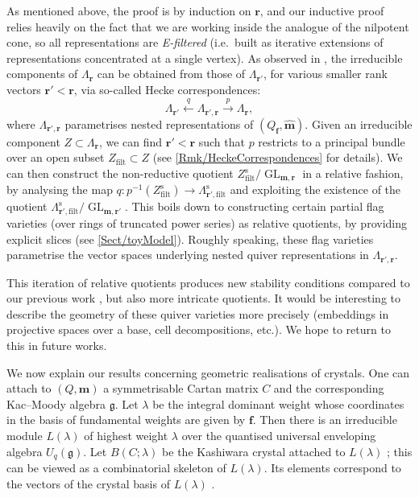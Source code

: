 \documentclass[a4paper,12pt]{article}
\theoremstyle{definition}
\theoremstyle{plain}
\theoremstyle{remark}
\DeclareMathOperator{\GL}{GL}
\newcommand{\st}{\mathrm{s}}
\newcommand\bff{\mathbf{f}}
\newcommand\bfm{\mathbf{m}}
\newcommand\bfr{\mathbf{r}}
\begin{document}
As mentioned above, the proof is by induction on $\bfr$, and our inductive proof relies heavily on the fact that we are working inside the analogue of the nilpotent cone, so all representations are \emph{E-filtered} (i.e.\ built as iterative extensions of representations concentrated at a single vertex). As observed in \cite{Lus91,GLS18a}, the irreducible components of $\Lambda_\bfr$ can be obtained from those of $\Lambda_{\bfr'}$, for various smaller rank vectors $\bfr'<\bfr$, via so-called Hecke correspondences:
\[
\Lambda_{\bfr'}\overset{q}{\longleftarrow}\Lambda_{\bfr',\bfr}\overset{p}{\longrightarrow}\Lambda_\bfr
,
\]
where $\Lambda_{\bfr',\bfr}$ parametrises nested representations of $(Q_\bff,\widehat{\bfm})$. Given an irreducible component $Z\subset\Lambda_\bfr$, we can find $\bfr'<\bfr$ such that $p$ restricts to a principal bundle over an open subset $Z_{\mathrm{filt}}\subset Z$ (see \cref{Rmk/HeckeCorrespondences} for details). We can then construct the non-reductive quotient $Z_{\mathrm{filt}}^\st/\GL_{\bfm,\bfr}$ in a relative fashion, by analysing the map $q:p^{-1}(Z_{\mathrm{filt}}^\st)\rightarrow\Lambda_{\bfr',\mathrm{filt}}^\st$ and exploiting the existence of the quotient $\Lambda_{\bfr',\mathrm{filt}}^\st/\GL_{\bfm,\bfr'}$. This boils down to constructing certain partial flag varieties (over rings of truncated power series) as relative quotients, by providing explicit slices (see \cref{Sect/toyModel}). Roughly speaking, these flag varieties parametrise the vector spaces underlying nested quiver representations in $\Lambda_{\bfr',\bfr}$.

This iteration of relative quotients produces new stability conditions compared to our previous work \cite{HJV25}, but also more intricate quotients. It would be interesting to describe the geometry of these quiver varieties more precisely (embeddings in projective spaces over a base, cell decompositions, etc.). We hope to return to this in future works.

We now explain our results concerning geometric realisations of crystals. One can attach to $(Q,\bfm)$ a symmetrisable Cartan matrix $C$ and the corresponding Kac--Moody algebra $\mathfrak{g}$. Let $\lambda$ be the integral dominant weight whose coordinates in the basis of fundamental weights are given by $\bff$. Then there is an irreducible module $L(\lambda)$ of highest weight $\lambda$ over the quantised universal enveloping algebra $U_q(\mathfrak{g})$. Let $B(C;\lambda)$ be the Kashiwara crystal attached to $L(\lambda)$ \cite{Kas91}; this can be viewed as a combinatorial skeleton of $L(\lambda)$. Its elements correspond to the vectors of the crystal basis of $L(\lambda)$ \cite{Kas91,Lus91,GL93}.
\end{document}
